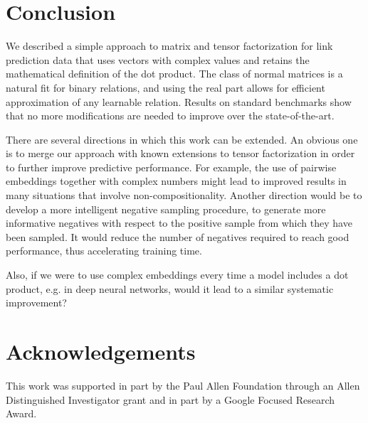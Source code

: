 \documentclass{article}
\begin{document}
\section{Conclusion}

We described a simple approach to matrix and tensor factorization for link prediction data that uses vectors with complex values and retains the mathematical definition of the dot product. 
The class of normal matrices is a natural fit for binary relations, and using the real part allows for efficient approximation of any learnable relation. Results on standard benchmarks show that no more modifications are needed to improve over the state-of-the-art. 




There are several directions in which this work can be extended. An obvious one is to merge our approach with known extensions to tensor factorization in order to further improve predictive performance. For example, the use of pairwise embeddings together with complex numbers might lead to improved results in many situations that involve non-compositionality. Another direction would be to develop a more intelligent negative sampling procedure, to generate more informative negatives with respect to the positive sample from which they have been sampled. It would reduce the number of negatives required to reach good performance, thus accelerating training time.

Also, if we were to use complex embeddings every time a model includes a dot product, e.g. in deep neural networks, would it lead to a similar systematic improvement? 


























\section*{Acknowledgements} 
This work was supported in part by the Paul
Allen Foundation through an Allen Distinguished
Investigator grant and in part by a Google Focused Research Award.



\end{document}

